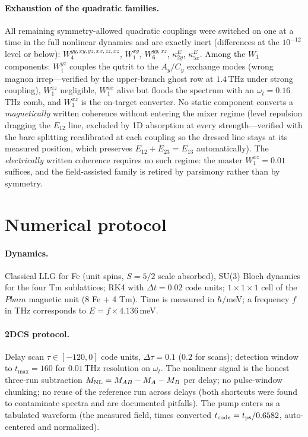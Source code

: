 \documentclass[11pt]{article}
\newcommand{\Mnl}{M_{\rm NL}}
\begin{document}
\paragraph{Exhaustion of the quadratic families.}
All remaining symmetry-allowed quadratic couplings were switched on one
at a time in the full nonlinear dynamics and are exactly inert
(differences at the $10^{-12}$ level or below): $W_4^{yy,xy,yz,xx,zz,xz}$,
$W_1^{xy}$, $W_6^{yy,xz}$, $\kappa^E_{2y}$, $\kappa^E_{5x}$.  Among the
$W_1$ components: $W_1^{yz}$ couples the qutrit to the $A_y/C_y$
exchange modes (wrong magnon irrep---verified by the upper-branch ghost
row at $1.4$\,THz under strong coupling), $W_1^{zz}$ negligible,
$W_1^{xx}$ alive but floods the spectrum with an $\omega_t=0.16$\,THz
comb, and $W_1^{xz}$ is the on-target converter.  No static component
converts a \emph{magnetically} written coherence without entering the
mixer regime (level repulsion dragging the $E_{12}$ line, excluded by
1D absorption at every strength---verified with the bare splitting
recalibrated at each coupling so the dressed line stays at its measured
position, which preserves $E_{12}{+}E_{23}{=}E_{13}$ automatically).
The \emph{electrically} written coherence requires no such regime: the
master $W^{xz}_1=0.01$ suffices, and the field-assisted family is
retired by parsimony rather than by symmetry.

\section{Numerical protocol}
\label{si:numerics}

\paragraph{Dynamics.}  Classical LLG for Fe (unit spins, $S=5/2$ scale
absorbed), SU(3) Bloch dynamics for the four Tm sublattices; RK4 with
$\Delta t=0.02$ code units; $1\times1\times1$ cell of the $Pbnm$
magnetic unit (8 Fe + 4 Tm).  Time is measured in $\hbar/$meV; a
frequency $f$ in THz corresponds to $E=f\times4.136$\,meV.

\paragraph{2DCS protocol.}  Delay scan $\tau\in[-120,0]$ code units,
$\Delta\tau=0.1$ ($0.2$ for scans); detection window to
$t_{\max}=160$ for $0.01$\,THz resolution on $\omega_t$.  The nonlinear
signal is the honest three-run subtraction
$\Mnl=M_{AB}-M_A-M_B$ per delay; no pulse-window chunking; no reuse of
the reference run across delays (both shortcuts were found to
contaminate spectra and are documented pitfalls).  The pump enters as a
tabulated waveform (the measured field, times converted
$t_{\rm code}=t_{\rm ps}/0.6582$, auto-centered and normalized).
\end{document}
